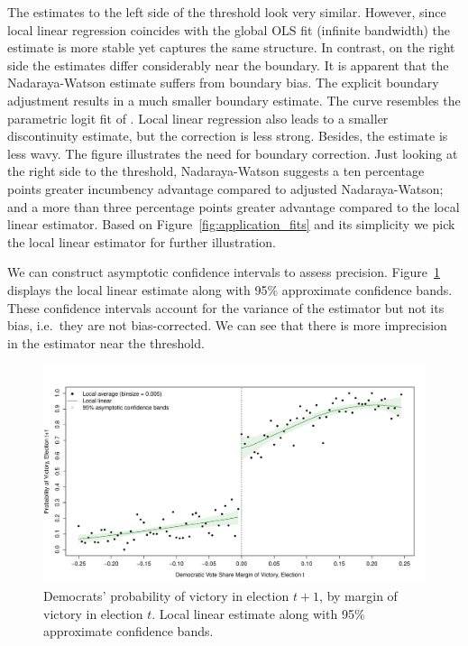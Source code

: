 \documentclass[a4paper, 12pt]{scrartcl}
\begin{document}
The estimates to the left side of the threshold look very similar.
However, since local linear regression coincides with the global OLS fit (infinite bandwidth) the estimate is more stable
yet captures the same structure.
In contrast, on the right side the estimates differ considerably near the boundary.
It is apparent that the Nadaraya-Watson estimate suffers from boundary bias.
The explicit boundary adjustment results in a much smaller boundary estimate.
The curve resembles the parametric logit fit of \textcite[Fig.\ 5a]{Lee_2008}.
Local linear regression also leads to a smaller discontinuity estimate, but the correction is less strong.
Besides, the estimate is less wavy.
The figure illustrates the need for boundary correction.
Just looking at the right side to the threshold,
Nadaraya-Watson suggests a ten percentage points greater incumbency advantage compared to adjusted Nadaraya-Watson;
and a more than three percentage points greater advantage compared to the local linear estimator.
Based on Figure~\ref{fig:application_fits} and its simplicity we pick the local linear estimator for further illustration.

We can construct asymptotic confidence intervals to assess precision.
Figure~\ref{fig:application_confidence_bands} displays the local linear estimate along with 95\% approximate confidence bands.
These confidence intervals account for the variance of the estimator but not its bias,
i.e.\ they are not bias-corrected.
We can see that there is more imprecision in the estimator near the threshold.

\begin{figure}
	\centering
	\includegraphics[trim=0 15 20 50, clip, width=\textwidth]{application_figure_05.pdf}
	\caption{Democrats' probability of victory in election $t+1$, by margin of victory in election $t$.
			 Local linear estimate along with 95\% approximate confidence bands.}
	\label{fig:application_confidence_bands}
\end{figure}

\printbibliography
\end{document}
